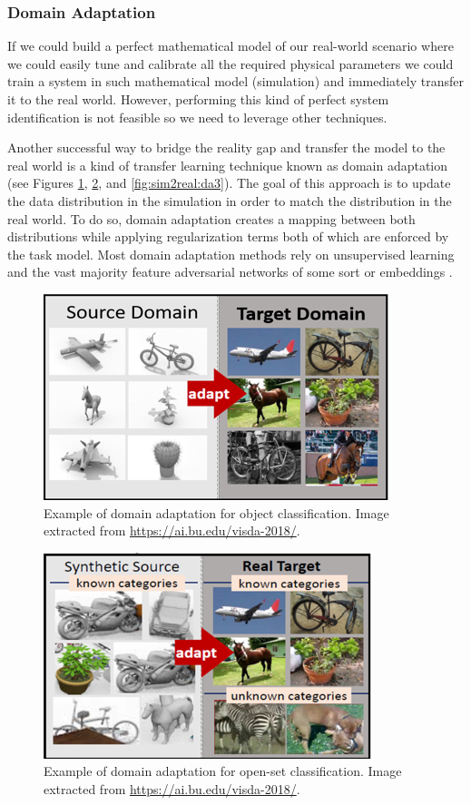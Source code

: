 \clearpage

\subsubsection{Domain Adaptation}

If we could build a perfect mathematical model of our real-world scenario where we could easily tune and calibrate all the required physical parameters we could train a system in such mathematical model (simulation) and immediately transfer it to the real world. However, performing this kind of perfect system identification is not feasible so we need to leverage other techniques.

Another successful way to bridge the reality gap and transfer the model to the real world is a kind of transfer learning technique known as domain adaptation (see Figures \ref{fig:sim2real:da1}, \ref{fig:sim2real:da2}, and \ref{fig:sim2real:da3}). The goal of this approach is to update the data distribution in the simulation in order to match the distribution in the real world. To do so, domain adaptation creates a mapping between both distributions while applying regularization terms both of which are enforced by the task model. Most domain adaptation methods rely on unsupervised learning and the vast majority feature adversarial networks of some sort \cite{Pinheiro2018, Sankaranarayanan2018, Hong2018} or embeddings \cite{Murez2018}.

\begin{figure}[!htb]
	\centering
	\includegraphics[width=0.55\linewidth]{Figures/Sim2Real/domainadapt1.png}
	\caption{Example of domain adaptation for object classification. Image extracted from \url{https://ai.bu.edu/visda-2018/}.}
	\label{fig:sim2real:da1}
\end{figure}

\begin{figure}[!htb]
	\centering
	\includegraphics[width=0.55\linewidth]{Figures/Sim2Real/domainadapt2.png}
	\caption{Example of domain adaptation for open-set classification. Image extracted from \url{https://ai.bu.edu/visda-2018/}.}
	\label{fig:sim2real:da2}
\end{figure}

